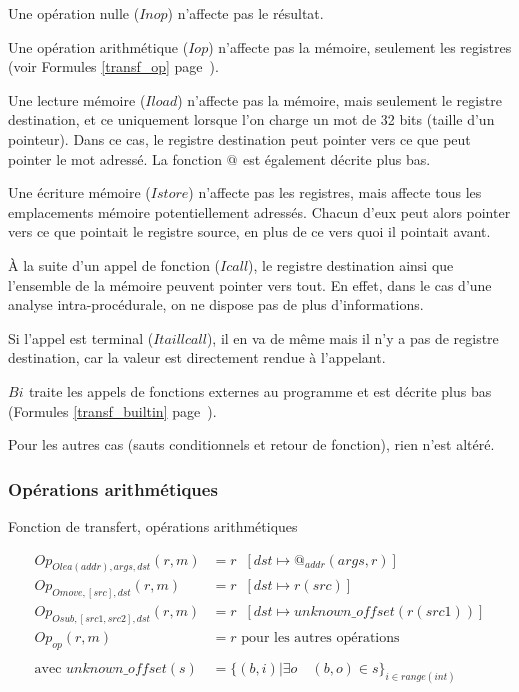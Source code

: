 \documentclass{article}
\makeatletter
\newcommand\mi{\mathit}
\newcommand\Op[1]{Op_{\mi{#1}}}
\newcommand\Bi[1]{Bi_{\mi{#1}}}
\newcommand\At[1]{@_{\mi{#1}}}
\newcommand\tR{\mathcal{R}}
\DeclareMathOperator*{\lubR}{{\sqcup}_\tR}
\makeatother
\begin{document}
Une opération nulle ($Inop$) n'affecte pas le résultat.

Une opération arithmétique ($Iop$) n'affecte pas la mémoire,
seulement les registres (voir Formules \ref{transf_op}
page~\pageref{transf_op}).

Une lecture mémoire ($Iload$) n'affecte pas la mémoire, mais
seulement le registre destination, et ce uniquement lorsque l'on charge un mot
de 32 bits (taille d'un pointeur). Dans ce cas, le registre destination peut
pointer vers ce que peut pointer le mot adressé. La fonction $\At{}$ est
également décrite plus bas.

Une écriture mémoire ($Istore$) n'affecte pas les registres, mais
affecte tous les emplacements mémoire potentiellement adressés. Chacun d'eux
peut alors pointer vers ce que pointait le registre source, en plus de ce vers
quoi il pointait avant.

À la suite d'un appel de fonction ($Icall$), le registre destination
ainsi que l'ensemble de la mémoire peuvent pointer vers tout. En effet, dans le
cas d'une analyse intra-procédurale, on ne dispose pas de plus d'informations.

Si l'appel est terminal ($Itaillcall$), il en va de même mais il n'y
a pas de registre destination, car la valeur est directement rendue à
l'appelant.

$\Bi{}$ traite les appels de fonctions externes au programme et est décrite
plus bas (Formules \ref{transf_builtin} page~\pageref{transf_builtin}).

Pour les autres cas (sauts conditionnels et retour de fonction), rien n'est
altéré.

\subsubsection*{Opérations arithmétiques}

\begin{formulae}
\caption{Fonction de transfert, opérations arithmétiques}
\label{transf_op}
\begin{align*}
\Op{Olea(addr), args, dst}(r, m) &=
r \lubR [\mi{dst} \mapsto @_{addr}(\mi{args}, r)]
\\
\Op{Omove, [src], dst}(r, m) &=
r \lubR [\mi{dst} \mapsto r(\mi{src})]
\\
\Op{Osub, [src1, src2], dst}(r, m) &=
r \lubR [\mi{dst} \mapsto \mi{unknown\_offset}(r(\mi{src1}))]
\\
\Op{op}(r, m) &= r \text{ pour les autres opérations}
\\
\\
\text{avec } \mi{unknown\_offset}(s) &=
\{(b, i) | \exists o \quad (b, o) \in s\}_{i \in range(int)}
\end{align*}
\end{formulae}
\end{document}
